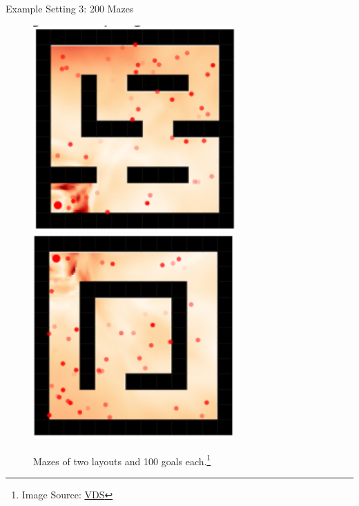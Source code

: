 \begin{frame}[c]{Example Setting 3: 200 Mazes}

\begin{figure}
\centering
\includegraphics[scale=1]{images/maze}
\includegraphics[scale=1]{images/maze2}
\caption{Mazes of two layouts and 100 goals each.\footnote{Image Source: \href{https://arxiv.org/pdf/2006.09641.pdf}{VDS}}}
\end{figure}
	
\end{frame}
